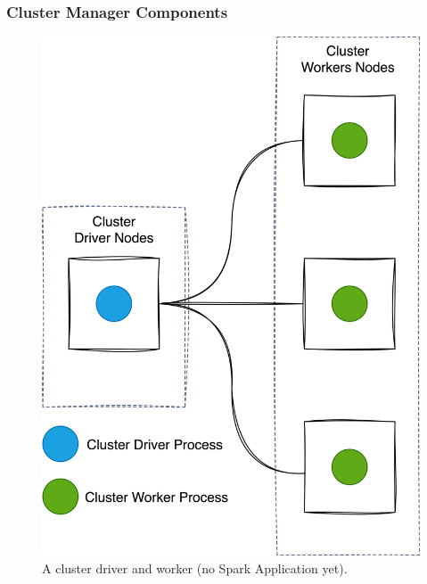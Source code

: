 \begin{frame}
    \frametitle{Cluster Manager Components}
    \begin{figure}
        \includegraphics[width=\textwidth,height=.7\textheight,keepaspectratio]{./Figures/chapter-04/cluster_manager_processes}
        \caption{A cluster driver and worker (no Spark Application yet).}\label{fig:cluster_manager_processes}
    \end{figure}
\end{frame}


